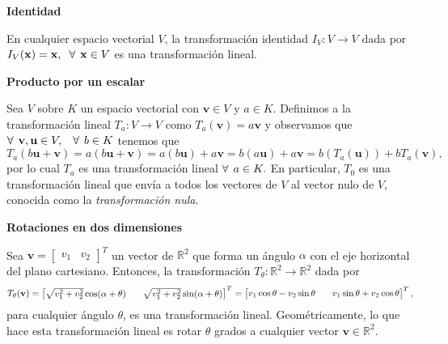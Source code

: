 \documentclass[12pt]{article}
\begin{document}
\textbf{Identidad} 

En cualquier espacio vectorial $V$, la transformación identidad $I_V:V\to V$ dada por $I_V(\mathbf{x})=\mathbf{x}, \hspace{2mm}\forall\hspace{1.5mm}\mathbf{x}\in V$ es una transformación lineal. 
\vspace{3mm}

\textbf{Producto por un escalar} 

Sea $V$ sobre $K$ un espacio vectorial con $\mathbf{v} \in V$ y $a\in K$. Definimos a la transformación lineal $T_a:V\to V$ como $T_a(\mathbf{v}) = a\mathbf{v}$ y observamos que $\forall \hspace{1.5mm} \mathbf{v}, \mathbf{u}\in V, \hspace{3mm} \forall\hspace{1.5mm} b\in K$ tenemos que \[
    T_a(b\mathbf{u}+\mathbf{v})=a(b\mathbf{u}+\mathbf{v})=a(b\mathbf{u})+a\mathbf{v}=b(a\mathbf{u})+a\mathbf{v}=b(T_a(\mathbf{u}))+bT_a(\mathbf{v})
,\] \noindent por lo cual $T_a$ es una transformación lineal $\forall \hspace{1.5mm} a\in K.$ En particular, $T_0$ es una transformación lineal que envía a todos los vectores de $V$ al vector nulo de $V$, conocida como la \emph{transformación nula}.
\vspace{3mm}

\textbf{Rotaciones en dos dimensiones} 

Sea $\mathbf{v}=\begin{bmatrix} v_1&v_2 \end{bmatrix}^T$ un vector de $\mathbb{R}^2$ que forma un ángulo $\alpha$ con el eje horizontal del plano cartesiano. Entonces, la transformación $T_{\theta}:\mathbb{R}^2\to \mathbb{R}^2$ dada por \[
T_{\theta}(\mathbf{v}) = \begin{bmatrix}\sqrt{v_1^2 + v_2^2}\cos(\alpha+\theta)&\hspace{3mm} \sqrt{v_1^2 + v_2^2}\sin(\alpha+\theta) \end{bmatrix}^T = \begin{bmatrix} v_1\cos\theta-v_2\sin\theta &\hspace{3mm}  v_1\sin\theta + v_2\cos\theta \end{bmatrix}^T, 
\] \noindent para cualquier ángulo $\theta$, es una transformación lineal. Geométricamente, lo que hace esta transformación lineal es rotar $\theta$ grados a cualquier vector $\mathbf{v}\in \mathbb{R}^2$.
\vspace{3mm}
\end{document}
